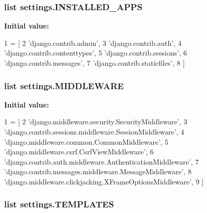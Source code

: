 \hypertarget{namespacesettings_a4386e1a879716ec5ba465c9065b8f3a2}{
\subsubsection[{I\-N\-S\-T\-A\-L\-L\-E\-D\-\_\-\-A\-P\-P\-S}]{\setlength{\rightskip}{0pt plus 5cm}list settings.\-I\-N\-S\-T\-A\-L\-L\-E\-D\-\_\-\-A\-P\-P\-S}}\label{namespacesettings_a4386e1a879716ec5ba465c9065b8f3a2}
{\bfseries Initial value\-:}
\begin{DoxyCode}
1 = [
2     \textcolor{stringliteral}{'django.contrib.admin'},
3     \textcolor{stringliteral}{'django.contrib.auth'},
4     \textcolor{stringliteral}{'django.contrib.contenttypes'},
5     \textcolor{stringliteral}{'django.contrib.sessions'},
6     \textcolor{stringliteral}{'django.contrib.messages'},
7     \textcolor{stringliteral}{'django.contrib.staticfiles'},
8 ]
\end{DoxyCode}
\hypertarget{namespacesettings_aa7c8b17a548d602f7f36084273090309}{
\subsubsection[{M\-I\-D\-D\-L\-E\-W\-A\-R\-E}]{\setlength{\rightskip}{0pt plus 5cm}list settings.\-M\-I\-D\-D\-L\-E\-W\-A\-R\-E}}\label{namespacesettings_aa7c8b17a548d602f7f36084273090309}
{\bfseries Initial value\-:}
\begin{DoxyCode}
1 = [
2     \textcolor{stringliteral}{'django.middleware.security.SecurityMiddleware'},
3     \textcolor{stringliteral}{'django.contrib.sessions.middleware.SessionMiddleware'},
4     \textcolor{stringliteral}{'django.middleware.common.CommonMiddleware'},
5     \textcolor{stringliteral}{'django.middleware.csrf.CsrfViewMiddleware'},
6     \textcolor{stringliteral}{'django.contrib.auth.middleware.AuthenticationMiddleware'},
7     \textcolor{stringliteral}{'django.contrib.messages.middleware.MessageMiddleware'},
8     \textcolor{stringliteral}{'django.middleware.clickjacking.XFrameOptionsMiddleware'},
9 ]
\end{DoxyCode}
\hypertarget{namespacesettings_a29deba90225a83452d28d1d26f15bb90}{
\subsubsection[{T\-E\-M\-P\-L\-A\-T\-E\-S}]{\setlength{\rightskip}{0pt plus 5cm}list settings.\-T\-E\-M\-P\-L\-A\-T\-E\-S}}\label{namespacesettings_a29deba90225a83452d28d1d26f15bb90}
